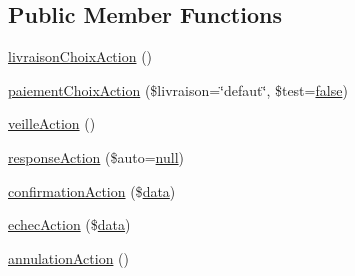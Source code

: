 \subsection*{Public Member Functions}
\begin{DoxyCompactItemize}
\item 
\hyperlink{class_acme_group_1_1_site_bundle_1_1_controller_1_1_sherlocks_controller_a9eec353e82332fd2ef2800fc1c749046}{livraison\+Choix\+Action} ()
\item 
\hyperlink{class_acme_group_1_1_site_bundle_1_1_controller_1_1_sherlocks_controller_adeb394e2581c1c8685af25d767953d55}{paiement\+Choix\+Action} (\$livraison=\char`\"{}defaut\char`\"{}, \$test=\hyperlink{validate_8js_a5df37b7f02e5cdc7d9412b7f872b8e01}{false})
\item 
\hyperlink{class_acme_group_1_1_site_bundle_1_1_controller_1_1_sherlocks_controller_a8e67f18a90b02e0f9b053dd1c36aeba5}{veille\+Action} ()
\item 
\hyperlink{class_acme_group_1_1_site_bundle_1_1_controller_1_1_sherlocks_controller_ab307d80db3cef8f8db47b2fccd8d59c2}{response\+Action} (\$auto=\hyperlink{validate_8js_afb8e110345c45e74478894341ab6b28e}{null})
\item 
\hyperlink{class_acme_group_1_1_site_bundle_1_1_controller_1_1_sherlocks_controller_a2a241f0e9fbb5976c5babfc41d002417}{confirmation\+Action} (\$\hyperlink{fullpage_2plugin_8js_a718c1bf5a3bf21ebb980203b142e5b75}{data})
\item 
\hyperlink{class_acme_group_1_1_site_bundle_1_1_controller_1_1_sherlocks_controller_a1ddf7558e0685d31aa8aa0bd05fd93c8}{echec\+Action} (\$\hyperlink{fullpage_2plugin_8js_a718c1bf5a3bf21ebb980203b142e5b75}{data})
\item 
\hyperlink{class_acme_group_1_1_site_bundle_1_1_controller_1_1_sherlocks_controller_a42da1e963a786ae585266aea49c42971}{annulation\+Action} ()
\end{DoxyCompactItemize}


